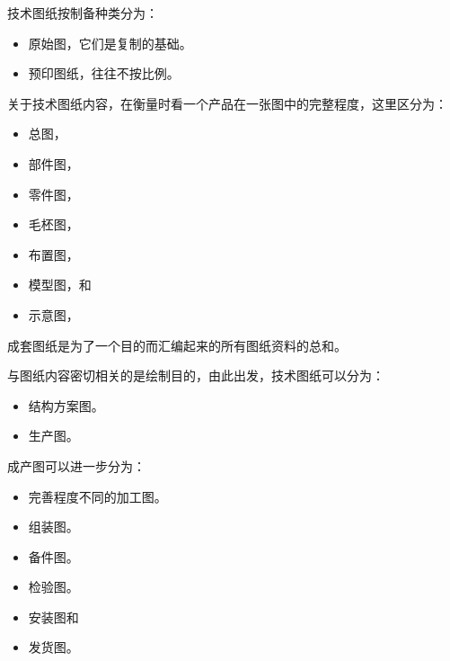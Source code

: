 \documentclass[letterpaper,10pt,english]{sphinxmanual}
\begin{document}
技术图纸按制备种类分为：
\begin{itemize}
\item {} 
原始图，它们是复制的基础。

\item {} 
预印图纸，往往不按比例。

\end{itemize}

关于技术图纸内容，在衡量时看一个产品在一张图中的完整程度，这里区分为：
\begin{itemize}
\item {} 
总图，

\item {} 
部件图，

\item {} 
零件图，

\item {} 
毛柸图，

\item {} 
布置图，

\item {} 
模型图，和

\item {} 
示意图，

\end{itemize}

成套图纸是为了一个目的而汇编起来的所有图纸资料的总和。

与图纸内容密切相关的是绘制目的，由此出发，技术图纸可以分为：
\begin{itemize}
\item {} 
结构方案图。

\item {} 
生产图。

\end{itemize}

成产图可以进一步分为：
\begin{itemize}
\item {} 
完善程度不同的加工图。

\item {} 
组装图。

\item {} 
备件图。

\item {} 
检验图。

\item {} 
安装图和

\item {} 
发货图。

\end{itemize}
\end{document}

